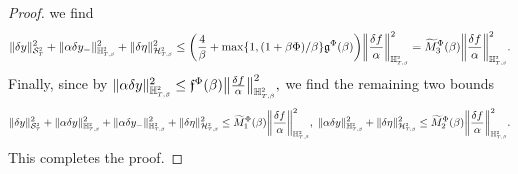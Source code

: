 \documentclass[10pt]{article} %
\newcommand\cH{\mathcal H}
\newcommand\cS{\mathcal S}
\newcommand{\smalltext}[1]{\text{\fontsize{4}{4}\selectfont$#1$}}
\newcommand\ff{\mathfrak f}
\newcommand\fg{\mathfrak g}
\def \H{\mathbb{H}}
\newcommand{\1}{\mathbf{1}}
\begin{document}
\begin{proof}
	we find
	\begin{equation*}
		\|\delta y\|^2_{\cS^\smalltext{2}_\smalltext{T}} + \|\alpha\delta y_{-}\|^2_{\H^\smalltext{2}_{\smalltext{T}\smalltext{,}\smalltext{\beta}}} + \|\delta\eta\|^2_{\cH^\smalltext{2}_{\smalltext{T}\smalltext{,}\smalltext{\beta}}} \leq \bigg(\frac{4}{\beta} + \max\{1,(1+\beta\Phi)/\beta\}\fg^\Phi(\beta)\bigg) \bigg\|\frac{\delta f}{\alpha}\bigg\|^2_{\H^\smalltext{2}_{\smalltext{T}\smalltext{,}\smalltext{\beta}}} = \widetilde M^\Phi_3(\beta)\bigg\|\frac{\delta f}{\alpha}\bigg\|^2_{\H^\smalltext{2}_{\smalltext{T}\smalltext{,}\smalltext{\beta}}}.
	\end{equation*}
	Finally, since by  $
		\|\alpha \delta y\|^2_{\H^{\smalltext{2}}_{\smalltext{T}\smalltext{,}\smalltext{\beta}}} 
		\leq \ff^\Phi(\beta) \big\| \frac{\delta f}{\alpha} \big\|^2_{\H^{\smalltext{2}}_{\smalltext{T}\smalltext{,}\smalltext{\beta}}},
$
	we find the remaining two bounds
	\begin{equation*}
		\|\delta y\|^2_{\cS^\smalltext{2}_\smalltext{T}} + \|\alpha \delta y\|^2_{\H^{\smalltext{2}}_{\smalltext{T}\smalltext{,}\smalltext{\beta}}} + \|\alpha\delta y_{-}\|^2_{\H^\smalltext{2}_{\smalltext{T}\smalltext{,}\smalltext{\beta}}} + \|\delta\eta\|^2_{\cH^\smalltext{2}_{\smalltext{T}\smalltext{,}\smalltext{\beta}}} 
		\leq \widetilde M^\Phi_1(\beta) \bigg\| \frac{\delta f}{\alpha} \bigg\|^2_{\H^{\smalltext{2}}_{\smalltext{T}\smalltext{,}\smalltext{\beta}}},\;
		\|\alpha \delta y\|^2_{\H^{\smalltext{2}}_{\smalltext{T}\smalltext{,}\smalltext{\beta}}} + \|\delta\eta\|^2_{\cH^\smalltext{2}_{\smalltext{T}\smalltext{,}\smalltext{\beta}}} 
		\leq \widetilde M^\Phi_2(\beta) \bigg\| \frac{\delta f}{\alpha} \bigg\|^2_{\H^{\smalltext{2}}_{\smalltext{T}\smalltext{,}\smalltext{\beta}}}.
	\end{equation*}
	This completes the proof.
\end{proof}
\end{document}
